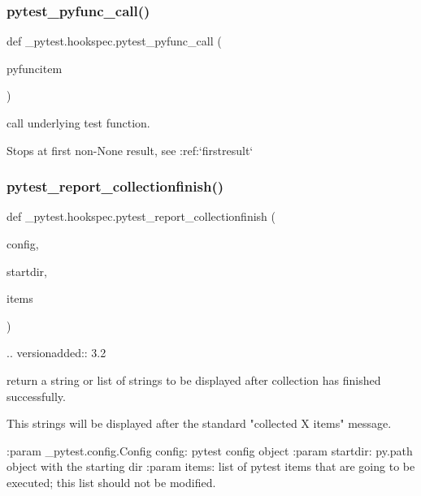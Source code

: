 \subsubsection{\texorpdfstring{pytest\+\_\+pyfunc\+\_\+call()}{pytest\_pyfunc\_call()}}
{\footnotesize\ttfamily def \+\_\+pytest.\+hookspec.\+pytest\+\_\+pyfunc\+\_\+call (\begin{DoxyParamCaption}\item[{}]{pyfuncitem }\end{DoxyParamCaption})}

\begin{DoxyVerb}call underlying test function.

Stops at first non-None result, see :ref:`firstresult` \end{DoxyVerb}
 \mbox{\label{namespace__pytest_1_1hookspec_a0d9ec0935d1a71bde956585a60771538}} 
\subsubsection{\texorpdfstring{pytest\+\_\+report\+\_\+collectionfinish()}{pytest\_report\_collectionfinish()}}
{\footnotesize\ttfamily def \+\_\+pytest.\+hookspec.\+pytest\+\_\+report\+\_\+collectionfinish (\begin{DoxyParamCaption}\item[{}]{config,  }\item[{}]{startdir,  }\item[{}]{items }\end{DoxyParamCaption})}

\begin{DoxyVerb}.. versionadded:: 3.2

return a string or list of strings to be displayed after collection has finished successfully.

This strings will be displayed after the standard "collected X items" message.

:param _pytest.config.Config config: pytest config object
:param startdir: py.path object with the starting dir
:param items: list of pytest items that are going to be executed; this list should not be modified.
\end{DoxyVerb}
 \mbox{\label{namespace__pytest_1_1hookspec_ad17018fc890c9706c68153433a575710}} 

